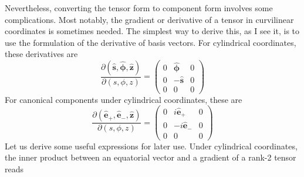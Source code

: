 Nevertheless, converting the tensor form to component form involves some complications. Most notably, the gradient or derivative of a tensor in curvilinear coordinates is sometimes needed. The simplest way to derive this, as I see it, is to use the formulation of the derivative of basis vectors. For cylindrical coordinates, these derivatives are
\begin{equation}
    \frac{\partial (\hat{\mathbf{s}}, \hat{\bm{\phi}}, \hat{\mathbf{z}})}{\partial (s, \phi, z)} = \begin{pmatrix}
        0 & \hat{\bm{\phi}} & 0 \\ 
        0 & -\hat{\mathbf{s}} & 0 \\
        0 & 0 & 0
    \end{pmatrix}
\end{equation}
For canonical components \citep{min_regularity_2024_submitted} under cylindrical coordinates, these are 
\begin{equation}
    \frac{\partial (\hat{\mathbf{e}}_+, \hat{\mathbf{e}}_-, \hat{\mathbf{z}})}{\partial (s, \phi, z)} = \begin{pmatrix}
        0 & i\hat{\mathbf{e}}_+ & 0 \\ 
        0 & -i\hat{\mathbf{e}}_- & 0 \\
        0 & 0 & 0
    \end{pmatrix}
\end{equation}
Let us derive some useful expressions for later use. 
Under cylindrical coordinates, the inner product between an equatorial vector and a gradient of a rank-2 tensor reads
